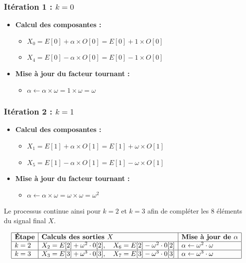 \subsubsection*{Itération 1 : $k=0$}
\begin{itemize}
    \item \textbf{Calcul des composantes :}
    \begin{itemize}
        \item $X_0 = E[0] + \alpha \times O[0] = E[0] + 1 \times O[0]$
        \item $X_4 = E[0] - \alpha \times O[0] = E[0] - 1 \times O[0]$
    \end{itemize}
    \item \textbf{Mise à jour du facteur tournant :}
    \begin{itemize}
        \item $\alpha \leftarrow \alpha \times \omega = 1 \times \omega = \omega$
    \end{itemize}
\end{itemize}

\subsubsection*{Itération 2 : $k=1$}
\begin{itemize}
    \item \textbf{Calcul des composantes :}
    \begin{itemize}
        \item $X_1 = E[1] + \alpha \times O[1] = E[1] + \omega \times O[1]$
        \item $X_5 = E[1] - \alpha \times O[1] = E[1] - \omega \times O[1]$
    \end{itemize}
    \item \textbf{Mise à jour du facteur tournant :}
    \begin{itemize}
        \item $\alpha \leftarrow \alpha \times \omega = \omega \times \omega = \omega^2$
    \end{itemize}
\end{itemize}

Le processus continue ainsi pour $k=2$ et $k=3$ afin de compléter les 8 éléments du signal final $X$.

\begin{flushleft}

\renewcommand{\arraystretch}{1.5}
\[
\begin{array}{|l|l|l|}
\hline
\textbf{Étape} & \textbf{Calculs des sorties } X & \textbf{Mise à jour de } \alpha \\
\hline
k=2 & X_2 = E[2] + \omega^2 \cdot 0[2], \quad X_6 = E[2] - \omega^2 \cdot 0[2] & \alpha \leftarrow \omega^2 \cdot \omega \\
\hline
k=3 & X_3 = E[3] + \omega^3 \cdot 0[3], \quad X_7 = E[3] - \omega^3 \cdot 0[3] & \alpha \leftarrow \omega^3 \cdot \omega \\
\hline
\end{array}
\]

\end{flushleft}

